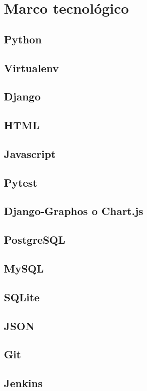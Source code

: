 \chapter{\textbf{Marco tecnológico}}
\thispagestyle{empty}

\section{Python}
\section{Virtualenv}
\section{Django}
\section{HTML}
\section{Javascript}
\section{Pytest}
\section{Django-Graphos o Chart.js}
\section{PostgreSQL}
\section{MySQL}
\section{SQLite}
\section{JSON}
\section{Git}
\section{Jenkins}

